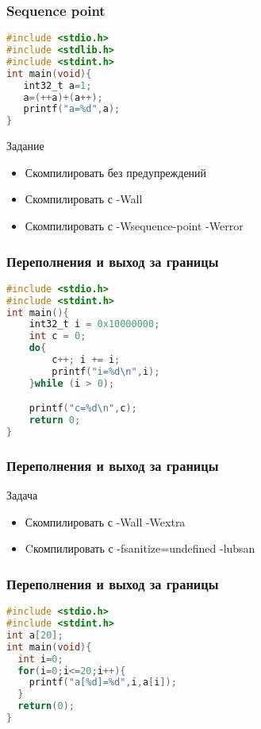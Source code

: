 \begin{frame}[fragile]
   \frametitle{Sequence point}

\begin{lstlisting}[language=C]
#include <stdio.h>
#include <stdlib.h>
#include <stdint.h>
int main(void){
   int32_t a=1;
   a=(++a)+(a++);
   printf("a=%d",a);
}
\end{lstlisting}

\begin{block}{Задание}
\begin{itemize}
  \item Скомпилировать без предупреждений
  \item Скомпилировать с -Wall
  \item Скомпилировать с -Wsequence-point -Werror
\end{itemize}
\end{block}

\end{frame}

\begin{frame}[fragile]
  \frametitle{Переполнения и выход за границы}
\begin{lstlisting}[language=C]
#include <stdio.h>
#include <stdint.h>
int main(){
    int32_t i = 0x10000000;
    int c = 0;
    do{
        c++; i += i;
        printf("i=%d\n",i);
    }while (i > 0);

    printf("c=%d\n",c);
    return 0;
}
\end{lstlisting}
\end{frame}

\begin{frame}
  \frametitle{Переполнения и выход за границы}
  \begin{block}{Задача}
   \begin{itemize}
     \item Скомпилировать с -Wall -Wextra
     \item Cкомпилировать с -fsanitize=undefined -lubsan
   \end{itemize}
  \end{block}
\end{frame}

\begin{frame}[fragile]
  \frametitle{Переполнения и выход за границы}
\begin{lstlisting}[language=C]
#include <stdio.h>
#include <stdint.h>
int a[20];
int main(void){
  int i=0;
  for(i=0;i<=20;i++){
    printf("a[%d]=%d",i,a[i]);
  }
  return(0);
}
\end{lstlisting}
\end{frame}


